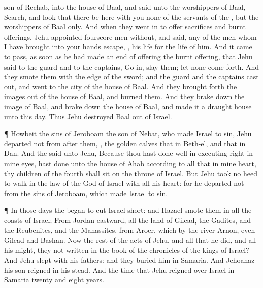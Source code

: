 {son of
Rechab, into the
house of
Baal, and
said unto the
worshippers of
Baal,
Search, and
look that there
be here with you none of the
servants of the
{}, but the
worshippers of
Baal only.
And when they went
in to
offer
sacrifices and burnt
offerings,
Jehu
appointed
fourscore
men
without, and
said,
{}
any of the
men whom I have
brought into your
hands
escape,
{}, his
life
{} for the
life of him.
And it came to pass, as soon as he had made an
end of
offering the burnt
offering, that
Jehu
said to the
guard and to the
captains, Go
in,
{}
slay them; let
none come
forth. And they
smote them with the
edge of the
sword; and the
guard and the
captains cast
{}
out, and
went to the
city of the
house of
Baal.
And they brought
forth the
images out of the
house of
Baal, and
burned them.
And they brake
down the
image of
Baal, and brake
down the
house of
Baal, and
made it a draught
house unto this
day.
Thus
Jehu
destroyed
Baal out of
Israel.
\par }{\PP {}¶ Howbeit
{} the
sins of
Jeroboam the
son of
Nebat, who made
Israel to
sin,
Jehu
departed not from
after them,
{}, the
golden
calves that
{} in
Beth-el, and that
{} in
Dan.
And the
{}
said unto
Jehu, Because thou hast done
well in
executing
{}
right in mine
eyes,
{} hast
done unto the
house of
Ahab according to all that
{} in mine
heart, thy
children of the
fourth
{} shall
sit on the
throne of
Israel.
But
Jehu took no
heed to
walk in the
law of the
{}
God of
Israel with all his
heart: for he
departed not from the
sins of
Jeroboam, which made
Israel to
sin.
\par }{\PP {}¶ In those
days the
{}
began to
cut
Israel
short: and
Hazael
smote them in all the
coasts of
Israel;
From
Jordan
eastward, all the
land of
Gilead, the
Gadites, and the
Reubenites, and the
Manassites, from
Aroer, which
{} by the
river
Arnon, even
Gilead and
Bashan.
Now the
rest of the
acts of
Jehu, and all that he
did, and all his
might,
{} they not
written in the
book of the
chronicles of the
kings of
Israel?
And
Jehu
slept with his
fathers: and they
buried him in
Samaria. And
Jehoahaz his
son
reigned in his stead.
And the
time that
Jehu
reigned over
Israel in
Samaria
{}
twenty and
eight
years.

}
